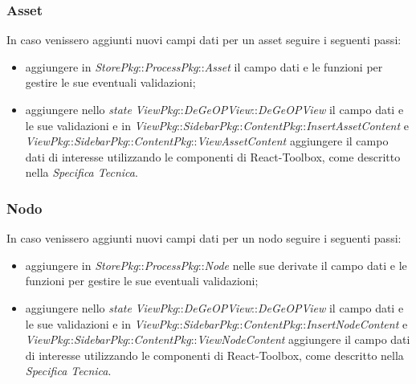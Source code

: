\subsubsection{Asset}In caso venissero aggiunti nuovi campi dati per un asset seguire i seguenti passi:
\begin{itemize}
	\item aggiungere in \textit{StorePkg}::\textit{ProcessPkg}::\textit{Asset} il campo dati e le funzioni per gestire le sue eventuali validazioni;
	\item aggiungere nello \textit{state} \textit{ViewPkg}::\textit{DeGeOPView}::\textit{DeGeOPView} il campo dati e le sue validazioni e in		\textit{ViewPkg}::\textit{SidebarPkg}::\textit{ContentPkg}::\textit{InsertAssetContent} e \textit{ViewPkg}::\textit{SidebarPkg}::\textit{ContentPkg}::\textit{ViewAssetContent} aggiungere il campo dati di interesse utilizzando le componenti di React-Toolbox, come descritto nella \textit{Specifica Tecnica}.
\end{itemize}

\subsubsection{Nodo}In caso venissero aggiunti nuovi campi dati per un  nodo seguire i seguenti passi:
\begin{itemize}
	\item aggiungere in \textit{StorePkg}::\textit{ProcessPkg}::\textit{Node} nelle sue derivate il campo dati e le funzioni per gestire le sue eventuali validazioni;
	\item aggiungere nello \textit{state} \textit{ViewPkg}::\textit{DeGeOPView}::\textit{DeGeOPView} il campo dati e le sue validazioni e in		\textit{ViewPkg}::\textit{SidebarPkg}::\textit{ContentPkg}::\textit{InsertNodeContent} e \textit{ViewPkg}::\textit{SidebarPkg}::\textit{ContentPkg}::\textit{ViewNodeContent} aggiungere il campo dati di interesse utilizzando le componenti di React-Toolbox, come descritto nella \textit{Specifica Tecnica}.
\end{itemize}

